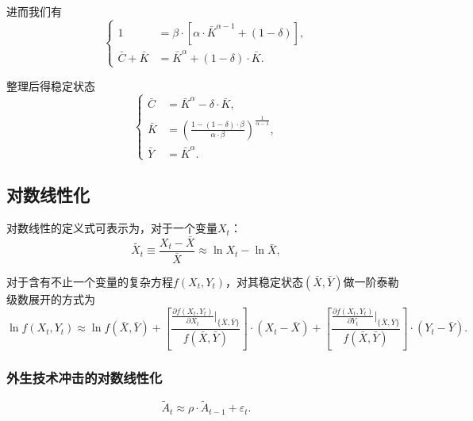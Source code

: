 进而我们有
\begin{equation*}
  \begin{cases}
    1 &= \beta \cdot \left[
    \alpha \cdot \bar{K}^{\alpha - 1} + (1-\delta)
    \right], \\
    \bar{C}+ \bar{K} &= \bar{K}^{\alpha} + (1-\delta) \cdot \bar{K}.
  \end{cases}
\end{equation*}

整理后得稳定状态
\begin{equation*}
  \begin{cases}
    \bar{C} &= \bar{K}^{\alpha} - \delta \cdot \bar{K}, \\
    \bar{K} &= \left(
    \frac{1-(1-\delta) \cdot \beta}{\alpha \cdot \beta}
    \right)^{\frac{1}{\alpha - 1}}, \\
    \bar{Y} &= \bar{K}^{\alpha}.
  \end{cases}
\end{equation*}

\subsection{对数线性化}
\label{sec:simple-loglin}
对数线性的定义式可表示为，对于一个变量$X_t$：
\begin{equation*}
  \tilde{X_t} \equiv \frac{X_t - \bar{X}}{\bar{X}} \approx \ln X_{t} - \ln \bar{X},
\end{equation*}

对于含有不止一个变量的复杂方程$f(X_t,Y_t)$，对其稳定状态$(\bar{X}, \bar{Y})$做一阶泰勒级数展开的方式为
\begin{equation*}
  \ln f(X_t,Y_t) \approx \ln f(\bar{X}, \bar{Y}) + \left[\frac{
  \frac{\partial f(X_t,Y_t)}{\partial X_t} |_{\{\bar{X},\bar{Y}\}}
  }{f(\bar{X},\bar{Y})}\right] \cdot \left(X_t - \bar{X}\right) +
  \left[\frac{
  \frac{\partial f(X_t,Y_t)}{\partial Y_t} |_{\{\bar{X},\bar{Y}\}}
  }{f(\bar{X},\bar{Y})}\right] \cdot \left(Y_t - \bar{Y}\right).
\end{equation*}

\subsubsection{外生技术冲击的对数线性化}
\begin{equation}
  \label{eq:simple-steady-state-tech-shock}
  \tilde{A}_{t} \approx \rho \cdot \tilde{A}_{t-1} + \varepsilon_t.
\end{equation}

